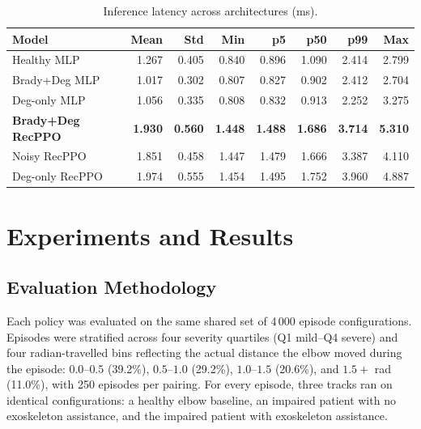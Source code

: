 \documentclass{article}
\begin{document}
\begin{table}[tbp]
  \centering
  \caption{Inference latency across architectures (ms).}
  \label{tab:latency}
  \small
  \begin{tabular}{lrrrrrrr}
    \toprule
    \textbf{Model} & \textbf{Mean} & \textbf{Std} & \textbf{Min}
      & \textbf{p5} & \textbf{p50} & \textbf{p99} & \textbf{Max} \\
    \midrule
    Healthy MLP              & 1.267 & 0.405 & 0.840 & 0.896 & 1.090 & 2.414 & 2.799 \\
    Brady+Deg MLP            & 1.017 & 0.302 & 0.807 & 0.827 & 0.902 & 2.412 & 2.704 \\
    Deg-only MLP             & 1.056 & 0.335 & 0.808 & 0.832 & 0.913 & 2.252 & 3.275 \\
    \textbf{Brady+Deg RecPPO}& \textbf{1.930} & \textbf{0.560}
      & \textbf{1.448} & \textbf{1.488} & \textbf{1.686}
      & \textbf{3.714} & \textbf{5.310} \\
    Noisy RecPPO             & 1.851 & 0.458 & 1.447 & 1.479 & 1.666 & 3.387 & 4.110 \\
    Deg-only RecPPO          & 1.974 & 0.555 & 1.454 & 1.495 & 1.752 & 3.960 & 4.887 \\
    \bottomrule
  \end{tabular}
\end{table}

\section{Experiments and Results}
\label{sec:results}

\subsection{Evaluation Methodology}

Each policy was evaluated on the same shared set of 4\,000 episode
configurations. Episodes were stratified across four severity quartiles
(Q1 mild--Q4 severe) and four radian-travelled bins reflecting the
actual distance the elbow moved during the episode:
$0.0$--$0.5$ (39.2\%), $0.5$--$1.0$ (29.2\%), $1.0$--$1.5$ (20.6\%),
and $1.5{+}$ rad (11.0\%), with 250 episodes per pairing. For every
episode, three tracks ran on identical configurations: a healthy elbow
baseline, an impaired patient with no exoskeleton assistance, and the
impaired patient with exoskeleton assistance.
\end{document}

